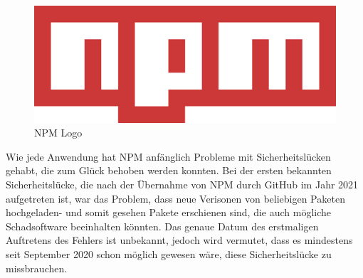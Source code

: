 \begin{figure}[H]
    \centering
    \includegraphics{media/NodeJs/NPM.png}
    \caption{NPM Logo \cite{NPMLOGO}}
\end{figure}

\begin{minipage}\textwidth
{}
Wie jede Anwendung hat NPM anfänglich Probleme mit Sicherheitslücken gehabt, die zum Glück behoben werden konnten. Bei der ersten bekannten Sicherheitslücke, die nach der Übernahme von NPM durch GitHub im Jahr 2021 aufgetreten ist, war das Problem, dass neue Verisonen von beliebigen Paketen hochgeladen- und somit gesehen Pakete erschienen sind, die auch mögliche Schadsoftware beeinhalten könnten. Das genaue Datum des erstmaligen Auftretens des Fehlers ist unbekannt, jedoch wird vermutet, dass es mindestens seit September 2020 schon möglich gewesen wäre, diese Sicherheitslücke zu missbrauchen. \cite{NPMSecurity}
\end{minipage}


